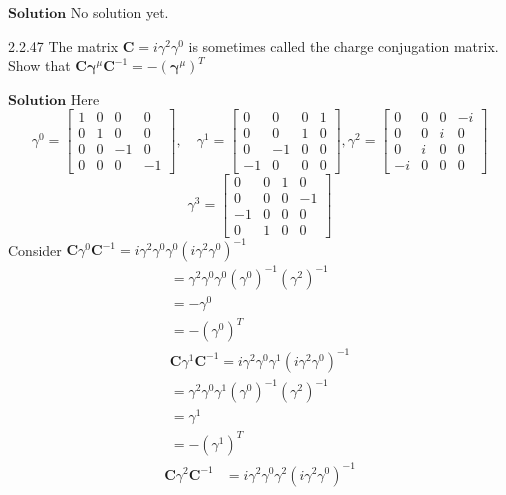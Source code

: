 \documentclass{article}
\begin{document}
\begin{flushleft}
$\boxed{\textbf{Solution}}$ No solution yet.
\begin{mybox}{2.2.47}
The matrix $\mathbf{C}=i \gamma^{2} \gamma^{0}$ is sometimes called the charge conjugation matrix. Show that $\mathbf{C} \boldsymbol{\gamma}^{\mu} \mathbf{C}^{-1}=-\left(\boldsymbol{\gamma}^{\mu}\right)^{T}$
\end{mybox}
$\boxed{\textbf{Solution}}$ Here
$$
\gamma^{0}=\begin{bmatrix}
1 & 0 & 0 & 0 \\
0 & 1 & 0 & 0 \\
0 & 0 & -1 & 0 \\
0 & 0 & 0 & -1
\end{bmatrix}, \quad \gamma^{1}=\begin{bmatrix}
0 & 0 & 0 & 1 \\
0 & 0 & 1 & 0 \\
0 & -1 & 0 & 0 \\
-1 & 0 & 0 & 0
\end{bmatrix}, \gamma^{2}=\begin{bmatrix}
0 & 0 & 0 & -i \\
0 & 0 & i & 0 \\
0 & i & 0 & 0 \\
-i & 0 & 0 & 0
\end{bmatrix}
$$
$$
\gamma^{3}=\begin{bmatrix}
0 & 0 & 1 & 0 \\
0 & 0 & 0 & -1 \\
-1 & 0 & 0 & 0 \\
0 & 1 & 0 & 0
\end{bmatrix}
$$
Consider $\mathbf{C} \gamma^{0} \mathbf{C}^{-1}=i \gamma^{2} \gamma^{0} \gamma^{0}\left(i \gamma^{2} \gamma^{0}\right)^{-1}$
$$
\begin{array}{l}
=\gamma^{2} \gamma^{0} \gamma^{0}\left(\gamma^{0}\right)^{-1}\left(\gamma^{2}\right)^{-1} \\
=-\gamma^{0} \\
=-\left(\gamma^{0}\right)^{T} \\
\mathbf{C} \gamma^{1} \mathbf{C}^{-1}=i \gamma^{2} \gamma^{0} \gamma^{1}\left(i \gamma^{2} \gamma^{0}\right)^{-1} \\
=\gamma^{2} \gamma^{0} \gamma^{1}\left(\gamma^{0}\right)^{-1}\left(\gamma^{2}\right)^{-1} \\
=\gamma^{1} \\
=-\left(\gamma^{1}\right)^{T}
\end{array}
$$
$$
\begin{aligned}
\mathbf{C} \gamma^{2} \mathbf{C}^{-1} &=i \gamma^{2} \gamma^{0} \gamma^{2}\left(i \gamma^{2} \gamma^{0}\right)^{-1} \\

\end{aligned}$$
\end{flushleft}
\end{document}
